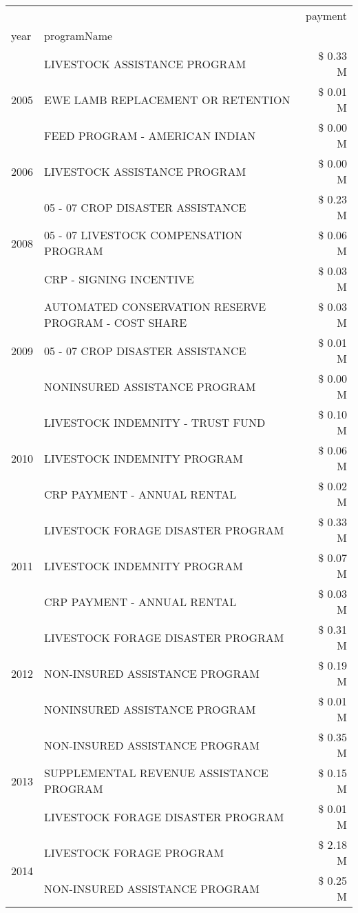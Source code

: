 \begin{tabular}{llr}
\toprule
 &  & payment \\
year & programName &  \\
\midrule
\multirow[t]{3}{*}{2005} & LIVESTOCK ASSISTANCE PROGRAM & \$ 0.33 M \\
 & EWE LAMB REPLACEMENT OR RETENTION & \$ 0.01 M \\
 & FEED PROGRAM - AMERICAN INDIAN & \$ 0.00 M \\
\cline{1-3}
2006 & LIVESTOCK ASSISTANCE PROGRAM & \$ 0.00 M \\
\cline{1-3}
\multirow[t]{3}{*}{2008} & 05 - 07 CROP DISASTER ASSISTANCE & \$ 0.23 M \\
 & 05 - 07 LIVESTOCK COMPENSATION PROGRAM & \$ 0.06 M \\
 & CRP - SIGNING INCENTIVE & \$ 0.03 M \\
\cline{1-3}
\multirow[t]{3}{*}{2009} & AUTOMATED CONSERVATION RESERVE PROGRAM - COST SHARE & \$ 0.03 M \\
 & 05 - 07 CROP DISASTER ASSISTANCE & \$ 0.01 M \\
 & NONINSURED ASSISTANCE PROGRAM & \$ 0.00 M \\
\cline{1-3}
\multirow[t]{3}{*}{2010} & LIVESTOCK INDEMNITY - TRUST FUND & \$ 0.10 M \\
 & LIVESTOCK INDEMNITY PROGRAM & \$ 0.06 M \\
 & CRP PAYMENT - ANNUAL RENTAL & \$ 0.02 M \\
\cline{1-3}
\multirow[t]{3}{*}{2011} & LIVESTOCK FORAGE DISASTER PROGRAM & \$ 0.33 M \\
 & LIVESTOCK INDEMNITY PROGRAM & \$ 0.07 M \\
 & CRP PAYMENT - ANNUAL RENTAL & \$ 0.03 M \\
\cline{1-3}
\multirow[t]{3}{*}{2012} & LIVESTOCK FORAGE DISASTER PROGRAM & \$ 0.31 M \\
 & NON-INSURED ASSISTANCE PROGRAM & \$ 0.19 M \\
 & NONINSURED ASSISTANCE PROGRAM & \$ 0.01 M \\
\cline{1-3}
\multirow[t]{3}{*}{2013} & NON-INSURED ASSISTANCE PROGRAM & \$ 0.35 M \\
 & SUPPLEMENTAL REVENUE ASSISTANCE PROGRAM & \$ 0.15 M \\
 & LIVESTOCK FORAGE DISASTER PROGRAM & \$ 0.01 M \\
\cline{1-3}
\multirow[t]{3}{*}{2014} & LIVESTOCK FORAGE PROGRAM & \$ 2.18 M \\
 & NON-INSURED ASSISTANCE PROGRAM & \$ 0.25 M \\

\end{tabular}
